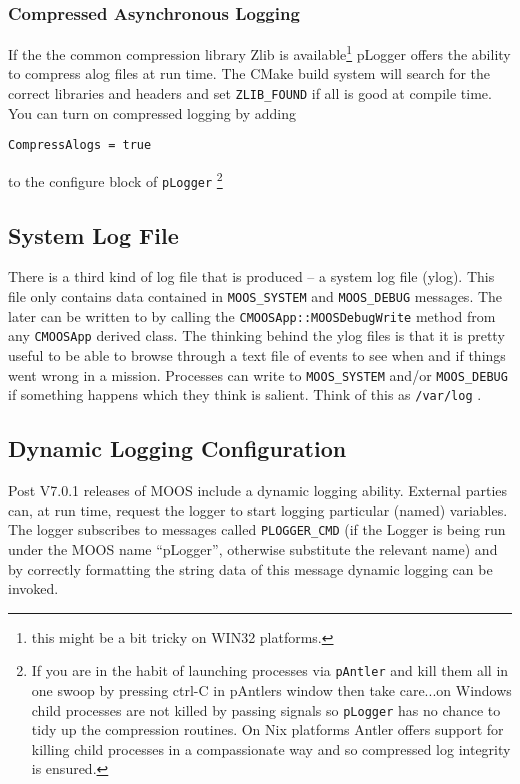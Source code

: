 \documentclass[a4paper,10pt]{article}
\newcommand{\Code}[1]{\texttt{#1} }
\newcommand{\code}[1]{\Code{#1} }
\begin{document}
\subsubsection{Compressed Asynchronous Logging}
If the the common compression library Zlib is available\footnote{this might be a bit tricky on WIN32 platforms.}  pLogger offers the ability to compress alog files at run time. The CMake build system will search for the correct libraries and headers and set \code{ZLIB\_FOUND} if all is good at compile time. You can turn on compressed logging by adding

\begin{center}
\code{CompressAlogs = true}
\end{center}

to the configure block of \code{pLogger}\footnote{If you are in the habit of launching processes via \code{pAntler} and kill them all in one swoop by pressing ctrl-C in pAntlers window then take care...on Windows child processes are not killed by passing signals so \code{pLogger} has no chance to tidy up the compression routines. On Nix platforms Antler offers support for  killing child processes in a compassionate  way and so compressed log integrity is ensured.}

\subsection{System Log File}
There is a third kind of log file that is produced -- a system log file (ylog). This file only contains
data contained in \code{MOOS\_SYSTEM} and \code{MOOS\_DEBUG} messages. The later can be written to by calling the \code{CMOOSApp::MOOSDebugWrite} method from any \code{CMOOSApp} derived class. The thinking behind the ylog files is that it is pretty useful to be able to browse through
a text file of events to see when and if things went wrong in a mission. Processes can write to \code{MOOS\_SYSTEM} and/or \code{MOOS\_DEBUG} if something happens which they think is salient. Think of this as \code{/var/log}.


\subsection{Dynamic Logging Configuration}
Post V7.0.1 releases of MOOS include a dynamic logging ability. External parties can, at run time, request the logger to start logging
particular (named) variables. The logger subscribes to messages called \code{PLOGGER\_CMD} (if the Logger is being run under the MOOS name ``pLogger'', otherwise substitute the relevant name) and by correctly formatting the string data of this message dynamic logging can be invoked.
\end{document}
